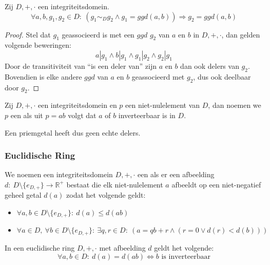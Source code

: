 \documentclass[main.tex]{subfiles}
\begin{document}
\begin{st}
  Zij $D,+,\cdot$ een integriteitsdomein.
  \[ \forall a,b,g_{1},g_{2} \in D:\ (g_{1} \sim_{D} g_{2} \wedge g_{1} = ggd(a,b)) \Rightarrow g_{2} = ggd(a,b) \]

  \begin{proof}
    Stel dat $g_{1}$ geassocieerd is met een $ggd$ $g_{2}$ van $a$ en $b$ in $D,+,\cdot$, dan gelden volgende beweringen:
    \[ a | g_{1} \wedge b | g_{1} \wedge g_{1} | g_{2} \wedge g_{2} | g_{1} \]
    Door de transitiviteit van ``is een deler van'' zijn $a$ en $b$ dan ook delers van $g_{2}$.
    Bovendien is elke andere $ggd$ van $a$ en $b$ geassocieerd met $g_{2}$, dus ook deelbaar door $g_{2}$.
  \end{proof}
\end{st}

\begin{de}
  Zij $D,+,\cdot$ een integriteitsdomein en $p$ een niet-nulelement van $D$, dan noemen we $p$ een  als uit $p=ab$ volgt dat $a$ of $b$ inverteerbaar is in $D$.
\end{de}

\begin{opm}
  Een priemgetal heeft dus geen echte delers.
\end{opm}

\subsubsection{Euclidische Ring}
\label{sec:euclidische-ring}

\begin{de}
  We noemen een integriteitsdomein $D,+,\cdot$ een  als er een afbeelding $d:\ D\setminus \{e_{D,+}\} \rightarrow \mathbb{R}^{+}$ bestaat die elk niet-nulelement $a$ afbeeldt op een niet-negatief geheel getal $d(a)$ zodat het volgende geldt:
\begin{itemize}
\item $\forall a,b \in D\setminus \{e_{D,+}\}:\ d(a) \le d(ab)$
\item $\forall a \in D,\ \forall b\in D\setminus \{e_{D,+}\}:\ \exists q,r \in D:\ (a = qb+r \wedge (r=0 \vee d(r) < d(b)))$
\end{itemize}
\end{de}

\begin{st}
  In een euclidische ring $D,+,\cdot$ met afbeelding $d$ geldt het volgende:
  \[ \forall a,b \in D:\ d(a) = d(ab) \Leftrightarrow b \text{ is inverteerbaar} \]
\end{st}
\end{document}
